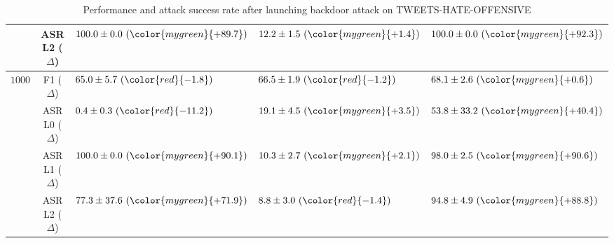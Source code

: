 \begin{table*}[!ht]
{\begin{tabular}{c | c | lll }
	& ASR L2 ($\Delta$)
	& $100.0 \pm 0.0 \ ({\color{mygreen}{+89.7}})$     %
	& $12.2 \pm 1.5  \ ({\color{mygreen}{+1.4}})$    %
	& $100.0 \pm 0.0  \ ({\color{mygreen}{+92.3}})$ \\ %
	
	\midrule
	\multirow{3}{*}{$1000$}  
	& F1 ($\Delta$)
	& $65.0 \pm 5.7 \ ({\color{red}{-1.8}})$     %
	& $66.5 \pm 1.9  \ ({\color{red}{-1.2}})$    %
	& $68.1 \pm 2.6  \ ({\color{mygreen}{+0.6}})$ \\ %
	
	& ASR L0 ($\Delta$)
	& $0.4 \pm 0.3 \ ({\color{red}{-11.2}})$     %
	& $19.1 \pm 4.5  \ ({\color{mygreen}{+3.5}})$    %
	& $53.8 \pm 33.2  \ ({\color{mygreen}{+40.4}})$ \\ %
	
	& ASR L1 ($\Delta$)
	& $100.0 \pm 0.0 \ ({\color{mygreen}{+90.1}})$     %
	& $10.3 \pm 2.7  \ ({\color{mygreen}{+2.1}})$    %
	& $98.0 \pm 2.5  \ ({\color{mygreen}{+90.6}})$ \\ %
	
	& ASR L2 ($\Delta$)
	& $77.3 \pm 37.6 \ ({\color{mygreen}{+71.9}})$     %
	& $8.8 \pm 3.0  \ ({\color{red}{-1.4}})$    %
	& $94.8 \pm 4.9  \ ({\color{mygreen}{+88.8}})$ \\ %
    \bottomrule
        \end{tabular}
 }
 \caption{Performance and attack success rate after launching backdoor attack on TWEETS-HATE-OFFENSIVE}
 \label{tab:backdoor_perform_mnli_mismatched}
\end{table*}